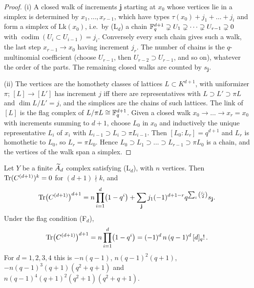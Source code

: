 \begin{proof}
(i) A closed walk of increments $\mathbf j$ starting at $x_0$ whose vertices lie in a simplex is
determined by $x_1,\dots,x_{r-1}$, which have types $\tau(x_0)+j_1+\dots+j_i$ and form a simplex of
$\mathrm{Lk}(x_0)$, i.e.\ by (L$_d$) a chain $\mathbb{F}_q^{d+1}\supsetneq U_1\supsetneq\dots\supsetneq
U_{r-1}\supsetneq0$ with $\operatorname{codim}(U_i\subset U_{i-1})=j_i$. Conversely every such chain gives
such a walk, the last step $x_{r-1}\to x_0$ having increment $j_r$. The number of chains is the
$q$-multinomial coefficient (choose $U_{r-1}$, then $U_{r-2}\supset U_{r-1}$, and so on), whatever the
order of the parts. The remaining closed walks are counted by $s_{\mathbf j}$.

(ii) The vertices are the homothety classes of lattices $L\subset K^{d+1}$, with uniformizer
$\pi$; $[L]\to[L']$ has increment $j$ iff there are representatives with $L\supset L'\supset\pi L$ and
$\dim L/L'=j$, and the simplices are the chains of such lattices. The link of $[L]$ is the flag complex
of $L/\pi L\cong\mathbb{F}_q^{d+1}$. Given a closed walk $x_0\to\dots\to x_r=x_0$ with increments summing to
$d+1$, choose $L_0$ in $x_0$ and inductively the unique representative $L_i$ of $x_i$ with
$L_{i-1}\supset L_i\supset\pi L_{i-1}$. Then $[L_0:L_r]=q^{d+1}$ and $L_r$ is homothetic to $L_0$,
so $L_r=\pi L_0$. Hence $L_0\supset L_1\supset\dots\supset L_{r-1}\supset\pi L_0$ is a chain, and the
vertices of the walk span a simplex.
\end{proof}

\begin{theorem}\label{V3P1:thm:tracead}
Let $Y$ be a finite $\widetilde A_{d}$ complex satisfying \textup{(L$_d$)}, with $n$ vertices. Then
$\operatorname{Tr}(C^{(d+1)})^{k}=0$ for $(d+1)\nmid k$, and
\[
\operatorname{Tr}\bigl(C^{(d+1)}\bigr)^{d+1}=n\prod_{i=1}^{d}\bigl(1-q^{i}\bigr)
+\sum_{\mathbf j}j_1(-1)^{d+1-r}q^{\sum_i\binom{j_i}2}s_{\mathbf j}.
\]
Under the flag condition \textup{(F$_d$)},
\[
\operatorname{Tr}\bigl(C^{(d+1)}\bigr)^{d+1}=n\prod_{i=1}^{d}\bigl(1-q^{i}\bigr)=(-1)^{d}\,n\,(q-1)^{d}\,[d]_q!\,.
\]
For $d=1,2,3,4$ this is $-n(q-1)$, $n(q-1)^{2}(q+1)$, $-n(q-1)^{3}(q+1)(q^{2}+q+1)$ and
$n(q-1)^{4}(q+1)^{2}(q^{2}+1)(q^{2}+q+1)$.
\end{theorem}

